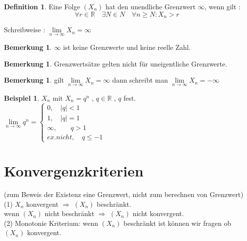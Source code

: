 \documentclass[a4paper,12pt,leqno]{report}
\theoremstyle{plain} %
\theoremstyle{definition} %
\newtheorem{remark}[theorem]{Bemerkung}
\newtheorem{definition}[theorem]{Definition}
\newtheorem{example}[theorem]{Beispiel}
\begin{document}
\begin{definition}
Eine Folge $(X_n)$ hat den unendliche Grenzwert $\infty$, wenn gilt : \\
\[\forall r \in \mathbb{R} \quad \exists N \in N \quad \forall n \geq N : X_n > r \]

Schreibweise : $\lim\limits_{n \rightarrow \infty}{X_n}= \infty$
\end{definition}

\begin{remark}
$\infty$ ist keine Grenzwerte und keine reelle Zahl.
\end{remark}

\begin{remark}
Grenzwertsätze gelten nicht für uneigentliche Grenzwerte.
\end{remark}

\begin{remark}
gilt $\lim\limits_{n \rightarrow \infty}{X_n}= \infty$ dann schreibt man $\lim\limits_{n \rightarrow \infty}{X_n}= -\infty$
\end{remark}

\begin{example}
$X_n$ mit $X_n = q^n$ , $q \in \mathbb{R}$ , $q$ fest.\\

$ \lim\limits_{n \rightarrow \infty}{q^n} = \begin{cases}
0 ,\quad |q|<1 \\
1 ,\quad |q|=1 \\
\infty ,\quad\quad q > 1  \\
ex. nicht ,\quad q\leq -1
\end{cases}$
\end{example}


\section{Konvergenzkriterien}
(zum Beweis der Existenz eine Grenzwert, nicht zum berechnen von Grenzwert) \\


(1) $X_n$ konvergent $\Rightarrow$ $(X_n)$ beschränkt. \\

wenn $(X_n)$ nicht beschränkt $\Rightarrow$ $(X_n)$ nicht konvergent.\\


(2) Monotonie Kriterium:
wenn $(X_n)$ beschränkt ist können wir fragen ob $(X_n)$    konvergent.\\
\end{document}
